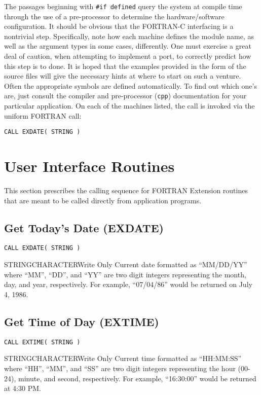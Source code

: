 The passages beginning with \verb+#if defined+ query the
system at compile time through the use of a pre-processor
to determine the hardware/software configuration.
It should be obvious that the FORTRAN-C interfacing is
a nontrivial step.
Specifically,
note how each machine defines the module name,
as well as the argument types in some cases,
differently.
One must exercise a great deal of caution, when attempting
to implement a port, to correctly predict how this step is to done.
It is hoped that the examples provided in the form of the source
files will give the necessary hints at where to start on such a
venture.
Often the appropriate symbols are defined automatically.
To find out which one's are, just consult the compiler
and pre-processor (\verb+cpp+) documentation
for your particular application.
On each of the machines listed,
the call is invoked via the uniform FORTRAN call:
\begin{verbatim}
CALL EXDATE( STRING )
\end{verbatim}

\section{User Interface Routines}
This section prescribes the calling sequence for FORTRAN Extension routines
that are meant to be called directly from application programs.

\subsection{Get Today's Date (EXDATE)}

\verb+CALL EXDATE( STRING )+

\begin{argy}{STRING}{CHARACTER}{Write Only}
Current date formatted as ``MM/DD/YY'' where ``MM'', ``DD'', and ``YY'' are
two digit integers representing the month, day, and year, respectively.  For
example, ``07/04/86'' would be returned on July 4, 1986. 
\end{argy}

\subsection{Get Time of Day (EXTIME)}

\verb+CALL EXTIME( STRING )+

\begin{argy}{STRING}{CHARACTER}{Write Only}
Current time formatted as ``HH:MM:SS'' where ``HH'', ``MM'', and ``SS'' are
two digit integers representing the hour (00-24), minute, and second,
respectively.  For example, ``16:30:00'' would be returned at 4:30 PM. 
\end{argy}

